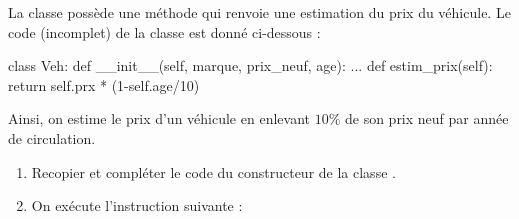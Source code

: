 \documentclass[11pt,a4paper,french,twoside]{PMCours}
\begin{document}
La classe  possède une méthode  qui renvoie une estimation du prix du
véhicule. Le code (incomplet) de la classe  est donné ci-dessous :
\begin{Python*}
class Veh:
    def __init__(self, marque, prix_neuf, age):
        ...
    def estim_prix(self):
        return self.prx * (1-self.age/10)
\end{Python*}
Ainsi, on estime le prix d'un véhicule en enlevant $10\%$ de son prix neuf par année de circulation.
\begin{enumerate}
\item Recopier et compléter le code du constructeur de la classe .
\item On exécute l'instruction suivante :

\medskip
{}


\end{enumerate}
\end{document}
